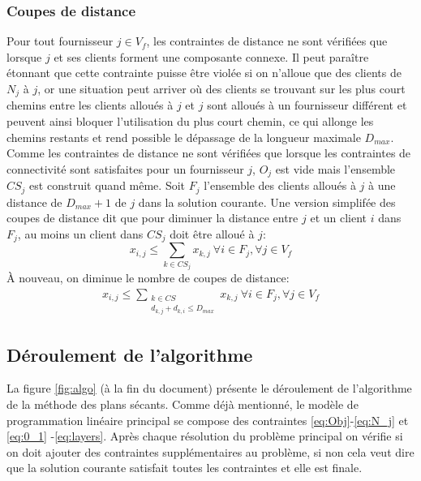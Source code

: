 \documentclass[12pt,a4paper]{article}
\begin{document}
\begin{multicols}{2}
\subsubsection*{Coupes de distance}
Pour tout fournisseur $j \in V_{f}$, les contraintes de distance ne sont vérifiées que lorsque $j$ et ses clients forment une composante connexe. Il peut paraître étonnant que cette contrainte puisse être violée si on n'alloue que des clients de $N_{j}$ à $j$, or une situation peut arriver où des clients se trouvant sur les plus court chemins entre les clients alloués à $j$ et $j$ sont alloués à un fournisseur différent et peuvent ainsi bloquer l'utilisation du plus court chemin, ce qui allonge les chemins restants et rend possible le dépassage de la longueur maximale $D_{max}$.\newline \indent
Comme les contraintes de distance ne sont vérifiées que lorsque les contraintes de connectivité sont satisfaites pour un fournisseur $j$, $O_{j}$ est vide mais l'ensemble $CS_{j}$ est construit quand même. Soit $F_{j}$ l'ensemble des clients alloués à $j$ à une distance de $D_{max}+1$ de $j$ dans la solution courante.\newline \indent
Une version simplifée des coupes de distance dit que pour diminuer la distance entre $j$ et un client $i$ dans $F_{j}$, au moins un client dans $CS_{j}$ doit être alloué à $j$:
\begin{equation*}
x_{i,j} \leq \sum_{k \in CS_{j}}{x_{k,j}} \ \forall i \in F_{j}, \forall j \in V_{f}
\end{equation*}
À nouveau, on diminue le nombre de coupes de distance:
\begin{equation}
\begin{aligned}
x_{i,j} \leq \sum_{\substack{k \in CS \\d_{k,j}+d_{k,i}\leq D_{max}}}{x_{k,j}} \ \forall i \in F_{j}, \forall j \in V_{f}
\end{aligned}
\end{equation}

\subsection{Déroulement de l'algorithme}
La figure \ref{fig:algo} (à la fin du document) présente le déroulement de l'algorithme de la méthode des plans sécants. Comme déjà mentionné, le modèle de programmation linéaire principal se compose des contraintes \eqref{eq:Obj}-\eqref{eq:N_j} et \eqref{eq:0_1} -\eqref{eq:layers}. Après chaque résolution du problème principal on vérifie si on doit ajouter des contraintes supplémentaires au problème, si non cela veut dire que la solution courante satisfait toutes les contraintes et elle est finale.

\end{multicols}
\end{document}
